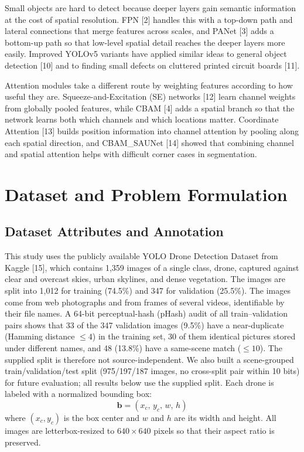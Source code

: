 \documentclass[conference]{IEEEtran}
\begin{document}
Small objects are hard to detect because deeper layers gain semantic information at the cost of spatial resolution. FPN [2] handles this with a top-down path and lateral connections that merge features across scales, and PANet [3] adds a bottom-up path so that low-level spatial detail reaches the deeper layers more easily. Improved YOLOv5 variants have applied similar ideas to general object detection [10] and to finding small defects on cluttered printed circuit boards [11].

Attention modules take a different route by weighting features according to how useful they are. Squeeze-and-Excitation (SE) networks [12] learn channel weights from globally pooled features, while CBAM [4] adds a spatial branch so that the network learns both which channels and which locations matter. Coordinate Attention [13] builds position information into channel attention by pooling along each spatial direction, and CBAM\_SAUNet [14] showed that combining channel and spatial attention helps with difficult corner cases in segmentation.

\section{Dataset and Problem Formulation}

\subsection{Dataset Attributes and Annotation}

This study uses the publicly available YOLO Drone Detection Dataset from Kaggle [15], which contains 1,359 images of a single class, drone, captured against clear and overcast skies, urban skylines, and dense vegetation. The images are split into 1,012 for training (74.5\%) and 347 for validation (25.5\%). The images come from web photographs and from frames of several videos, identifiable by their file names. A 64-bit perceptual-hash (pHash) audit of all train--validation pairs shows that 33 of the 347 validation images (9.5\%) have a near-duplicate (Hamming distance $\leq4$) in the training set, 30 of them identical pictures stored under different names, and 48 (13.8\%) have a same-scene match ($\leq10$). The supplied split is therefore not source-independent. We also built a scene-grouped train/validation/test split (975/197/187 images, no cross-split pair within 10 bits) for future evaluation; all results below use the supplied split. Each drone is labeled with a normalized bounding box:
\begin{equation}
\mathbf{b} = (x_c,\, y_c,\, w,\, h)
\end{equation}
where $(x_c, y_c)$ is the box center and $w$ and $h$ are its width and height. All images are letterbox-resized to $640\times640$ pixels so that their aspect ratio is preserved.
\end{document}
